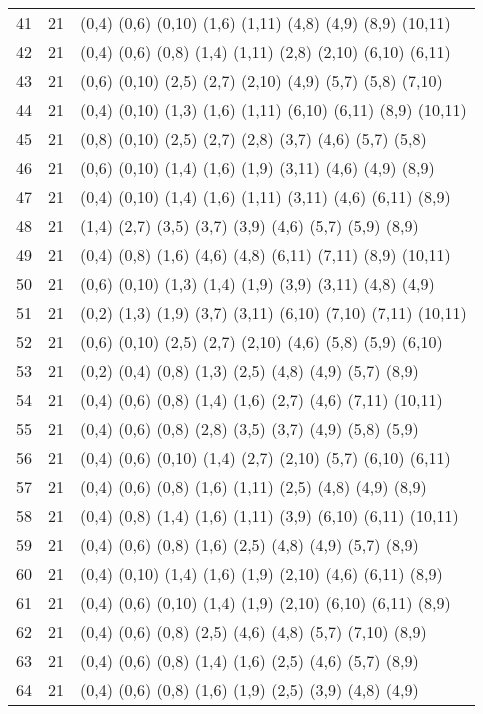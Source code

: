 {\begin{longtable}{lll}
41  & 21 & (0,4) (0,6) (0,10) (1,6) (1,11) (4,8) (4,9) (8,9) (10,11) \\
42  & 21 & (0,4) (0,6) (0,8) (1,4) (1,11) (2,8) (2,10) (6,10) (6,11) \\
43  & 21 & (0,6) (0,10) (2,5) (2,7) (2,10) (4,9) (5,7) (5,8) (7,10) \\
44  & 21 & (0,4) (0,10) (1,3) (1,6) (1,11) (6,10) (6,11) (8,9) (10,11) \\
45  & 21 & (0,8) (0,10) (2,5) (2,7) (2,8) (3,7) (4,6) (5,7) (5,8) \\
46  & 21 & (0,6) (0,10) (1,4) (1,6) (1,9) (3,11) (4,6) (4,9) (8,9) \\
47  & 21 & (0,4) (0,10) (1,4) (1,6) (1,11) (3,11) (4,6) (6,11) (8,9) \\
48  & 21 & (1,4) (2,7) (3,5) (3,7) (3,9) (4,6) (5,7) (5,9) (8,9) \\
49  & 21 & (0,4) (0,8) (1,6) (4,6) (4,8) (6,11) (7,11) (8,9) (10,11) \\
50  & 21 & (0,6) (0,10) (1,3) (1,4) (1,9) (3,9) (3,11) (4,8) (4,9) \\
51  & 21 & (0,2) (1,3) (1,9) (3,7) (3,11) (6,10) (7,10) (7,11) (10,11) \\
52  & 21 & (0,6) (0,10) (2,5) (2,7) (2,10) (4,6) (5,8) (5,9) (6,10) \\
53  & 21 & (0,2) (0,4) (0,8) (1,3) (2,5) (4,8) (4,9) (5,7) (8,9) \\
54  & 21 & (0,4) (0,6) (0,8) (1,4) (1,6) (2,7) (4,6) (7,11) (10,11) \\
55  & 21 & (0,4) (0,6) (0,8) (2,8) (3,5) (3,7) (4,9) (5,8) (5,9) \\
56  & 21 & (0,4) (0,6) (0,10) (1,4) (2,7) (2,10) (5,7) (6,10) (6,11) \\
57  & 21 & (0,4) (0,6) (0,8) (1,6) (1,11) (2,5) (4,8) (4,9) (8,9) \\
58  & 21 & (0,4) (0,8) (1,4) (1,6) (1,11) (3,9) (6,10) (6,11) (10,11) \\
59  & 21 & (0,4) (0,6) (0,8) (1,6) (2,5) (4,8) (4,9) (5,7) (8,9) \\
60  & 21 & (0,4) (0,10) (1,4) (1,6) (1,9) (2,10) (4,6) (6,11) (8,9) \\
61  & 21 & (0,4) (0,6) (0,10) (1,4) (1,9) (2,10) (6,10) (6,11) (8,9) \\
62  & 21 & (0,4) (0,6) (0,8) (2,5) (4,6) (4,8) (5,7) (7,10) (8,9) \\
63  & 21 & (0,4) (0,6) (0,8) (1,4) (1,6) (2,5) (4,6) (5,7) (8,9) \\
64  & 21 & (0,4) (0,6) (0,8) (1,6) (1,9) (2,5) (3,9) (4,8) (4,9) \\

\end{longtable}}
